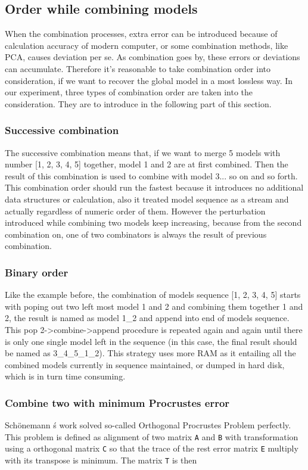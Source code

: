 \subsection{Order while combining models}
When the combination processes, extra error can be introduced because of calculation accuracy of modern computer, or some combination methods, like PCA, causes deviation per se. As combination goes by, these errors or deviations can accumulate. Therefore it's reasonable to take combination order into consideration, if we want to recover the global model in a most lossless way. In our experiment, three types of combination order are taken into the consideration. They are to introduce in the following part of this section.
	
	\subsubsection{Successive combination}
	The successive combination means that, if we want to merge 5 models with number [1, 2, 3, 4, 5] together, model 1 and 2 are at first combined. Then the result of this combination is used to combine with model 3... so on and so forth. This combination order should run the fastest because it introduces no additional data structures or calculation, also it treated model sequence as a stream and actually regardless of numeric order of them. However the perturbation introduced while combining two models keep increasing, because from the second combination on, one of two combinators is always the result of previous combination.

	\subsubsection{Binary order}
	Like the example before, the combination of models sequence [1, 2, 3, 4, 5] starts with poping out two left most model 1 and 2 and combining them together 1 and 2, the result is named as model 1\_2 and append into end of models sequence. This pop 2->combine->append procedure is repeated again and again until there is only one single model left in the sequence (in this case, the final result should be named as 3\_4\_5\_1\_2). This strategy uses more RAM as it entailing all the combined models currently in sequence maintained, or dumped in hard disk, which is in turn time consuming.

	\subsubsection{Combine two with minimum Procrustes error}
	Sch{\"o}nemann \'s work solved so-called Orthogonal Procrustes Problem perfectly. This problem is defined as alignment of two matrix \verb|A| and \verb|B| with transformation using a orthogonal matrix \verb|C| so that the trace of the rest error matrix \verb|E| multiply with its transpose is minimum. The matrix \verb|T| is then

